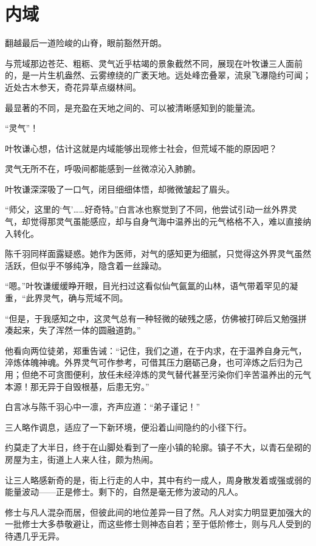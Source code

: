 \chapter{内域}

翻越最后一道险峻的山脊，眼前豁然开朗。

与荒域那边苍茫、粗粝、灵气近乎枯竭的景象截然不同，展现在叶牧谦三人面前的，是一片生机盎然、云雾缭绕的广袤天地。远处峰峦叠翠，流泉飞瀑隐约可闻；近处古木参天，奇花异草点缀林间。

最显著的不同，是充盈在天地之间的、可以被清晰感知到的能量流。

“灵气”！

叶牧谦心想，估计这就是内域能够出现修士社会，但荒域不能的原因吧？

灵气无所不在，呼吸间都能感到一丝微凉沁入肺腑。

叶牧谦深深吸了一口气，闭目细细体悟，却微微皱起了眉头。

“师父，这里的‘气’……好奇特。”白言冰也察觉到了不同，他尝试引动一丝外界灵气，却觉得那灵气虽能感应，却与自身气海中温养出的元气格格不入，难以直接纳入转化。

陈千羽同样面露疑惑。她作为医师，对气的感知更为细腻，只觉得这外界灵气虽然活跃，但似乎不够纯净，隐含着一丝躁动。

“嗯。”叶牧谦缓缓睁开眼，目光扫过这看似仙气氤氲的山林，语气带着罕见的凝重，“此界灵气，确与荒域不同。

“但是，于我感知之中，这灵气总有一种轻微的破残之感，仿佛被打碎后又勉强拼凑起来，失了浑然一体的圆融道韵。”

他看向两位徒弟，郑重告诫：“记住，我们之道，在于内求，在于温养自身元气，淬炼体魄神魂。外界灵气可作参考，可借其压力磨砺己身，也可淬炼之后归为己用；但绝不可贪图便利，放任未经淬炼的灵气替代甚至污染你们辛苦温养出的元气本源！那无异于自毁根基，后患无穷。”

白言冰与陈千羽心中一凛，齐声应道：“弟子谨记！”

三人略作调息，适应了一下新环境，便沿着山间隐约的小径下行。

\vspace{2em}

约莫走了大半日，终于在山脚处看到了一座小镇的轮廓。镇子不大，以青石垒砌的房屋为主，街道上人来人往，颇为热闹。

让三人略感新奇的是，街上行走的人中，其中有约一成人，周身散发着或强或弱的能量波动——正是修士。剩下的，自然是毫无修为波动的凡人。

修士与凡人混杂而居，但彼此间的地位差异一目了然。凡人对实力明显更加强大的一批修士大多恭敬避让，而这些修士则神态自若；至于低阶修士，则与凡人受到的待遇几乎无异。


